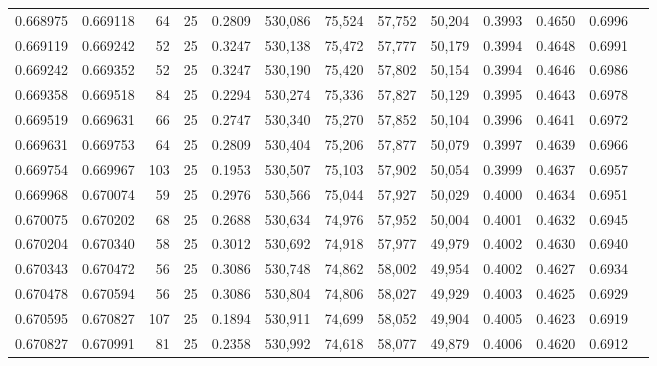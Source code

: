 \begin{tabular}{rrrrrrrrrrrrr}
0.668975 & 0.669118 &    64 &  25 &                                     0.2809 & 530,086 &  75,524 &  57,752 &  50,204 & 0.3993 & 0.4650 & 0.6996 \\
0.669119 & 0.669242 &    52 &  25 &                                     0.3247 & 530,138 &  75,472 &  57,777 &  50,179 & 0.3994 & 0.4648 & 0.6991 \\
0.669242 & 0.669352 &    52 &  25 &                                     0.3247 & 530,190 &  75,420 &  57,802 &  50,154 & 0.3994 & 0.4646 & 0.6986 \\
0.669358 & 0.669518 &    84 &  25 &                                     0.2294 & 530,274 &  75,336 &  57,827 &  50,129 & 0.3995 & 0.4643 & 0.6978 \\
0.669519 & 0.669631 &    66 &  25 &                                     0.2747 & 530,340 &  75,270 &  57,852 &  50,104 & 0.3996 & 0.4641 & 0.6972 \\
0.669631 & 0.669753 &    64 &  25 &                                     0.2809 & 530,404 &  75,206 &  57,877 &  50,079 & 0.3997 & 0.4639 & 0.6966 \\
0.669754 & 0.669967 &   103 &  25 &                                     0.1953 & 530,507 &  75,103 &  57,902 &  50,054 & 0.3999 & 0.4637 & 0.6957 \\
0.669968 & 0.670074 &    59 &  25 &                                     0.2976 & 530,566 &  75,044 &  57,927 &  50,029 & 0.4000 & 0.4634 & 0.6951 \\
0.670075 & 0.670202 &    68 &  25 &                                     0.2688 & 530,634 &  74,976 &  57,952 &  50,004 & 0.4001 & 0.4632 & 0.6945 \\
0.670204 & 0.670340 &    58 &  25 &                                     0.3012 & 530,692 &  74,918 &  57,977 &  49,979 & 0.4002 & 0.4630 & 0.6940 \\
0.670343 & 0.670472 &    56 &  25 &                                     0.3086 & 530,748 &  74,862 &  58,002 &  49,954 & 0.4002 & 0.4627 & 0.6934 \\
0.670478 & 0.670594 &    56 &  25 &                                     0.3086 & 530,804 &  74,806 &  58,027 &  49,929 & 0.4003 & 0.4625 & 0.6929 \\
0.670595 & 0.670827 &   107 &  25 &                                     0.1894 & 530,911 &  74,699 &  58,052 &  49,904 & 0.4005 & 0.4623 & 0.6919 \\
0.670827 & 0.670991 &    81 &  25 &                                     0.2358 & 530,992 &  74,618 &  58,077 &  49,879 & 0.4006 & 0.4620 & 0.6912 \\

\end{tabular}
